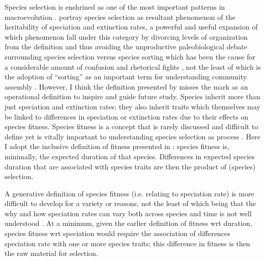 Species selection is enshrined as one of the most important patterns in macroevolution \citep{Stanley1975,Stanley1979,Vrba1986,Jablonski2008a,Rabosky2010b,Simpson2016a,Pennell2014}. \citet{Rabosky2010b} portray species selection as resultant phenomenon of the heritability of speciation and extinction rates, a powerful and useful expansion of which phenomenon fall under this category by divorcing levels of organization from the definition and thus avoiding the unproductive paleobiological debate surrounding species selection versus species sorting which has been the cause for a considerable amount of confusion and rhetorical fights \citep{Vrba1984a,Vrba1986,Lloyd1993,Pennell2014}, not the least of which is the adoption of ``sorting'' as an important term for understanding community assembly \citep{Urban2008,Loeuille2008,Holt2006,Cottenie2005,Soininen2014,VanderGucht2007,Shipley2006}. However, I think the definition presented by \citet{Rabosky2010b} misses the mark as an operational definition to inspire and guide future study. Species inherit more than just speciation and extinction rates; they also inherit traits which themselves may be linked to differences in speciation or extinction rates due to their effects on species fitness. Species fitness is a concept that is rarely discussed and difficult to define yet is vitally important to understanding species selection as process \citep{Cooper1984,Palmer2012}. Here I adopt the inclusive definition of fitness presented in \citet{Cooper1984}: species fitness is, minimally, the expected duration of that species. Differences in expected species duration that are associated with species traits are then the product of (species) selection.

A generative definition of species fitness (i.e. relating to speciation rate) is more difficult to develop for a variety or reasons, not the least of which being that the why and how speciation rates can vary both across species and time is not well understood \citep{Rabosky2015c,Rabosky2013e,Coyne2004}. At a minimum, given the earlier definition of fitness wrt duration, species fitness wrt speciation would require the association of differences speciation rate with one or more species traits; this difference in fitness is then the raw material for selection. 

